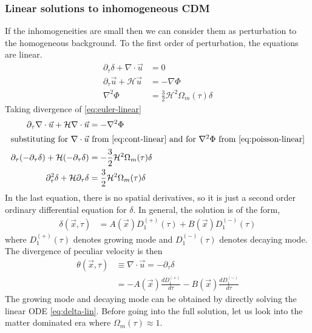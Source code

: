 \documentclass[12pt]{article}
\begin{document}
\subsubsection{Linear solutions to inhomogeneous CDM}
If the inhomogeneities are small then we can consider them as perturbation to the homogeneous background. To the first order of perturbation, the equations are linear.
\begin{align}
\label{eq:cont-linear}
\partial_{\tau} \delta + \nabla \cdot \vec{u} &= 0\\
\label{eq:euler-linear}
\partial_{\tau} \vec{u} + \mathcal{H} \vec{u} &= - \nabla \Phi\\
\label{eq:poisson-linear}
\nabla^2 \Phi &= \frac{3}{2} \mathcal{H}^2 \Omega_{m}(\tau) \delta
\end{align}
Taking divergence of \eqref{eq:euler-linear}
\begin{align}
\partial_{\tau} \nabla \cdot  \vec{u} + \mathcal{H} \nabla \cdot  \vec{u} &= - \nabla^2 \Phi \\
\intertext{substituting for $\nabla \cdot \vec{u}$ from \eqref{eq:cont-linear} and for $\nabla^2 \Phi$ from \eqref{eq:poisson-linear}}
\partial_{\tau} (-\partial_{\tau} \delta) + \mathcal{H} (-\partial_{\tau} \delta) &= - \frac{3}{2} \mathcal{H}^2 \Omega_{m}(\tau) \delta\\
\partial_{\tau}^2 \delta + \mathcal{H} \partial_{\tau} \delta &= \frac{3}{2} \mathcal{H}^2 \Omega_{m}(\tau) \delta \label{eq:delta-lin}
\end{align}
In the last equation, there is no spatial derivatives, so it is just a second order ordinary differential equation for $\delta$. In general, the solution is of the form,
\begin{align}
\delta (\vec{x}, \tau) &= A(\vec{x}) D_1^{(+)}(\tau) + B(\vec{x}) D_1^{(-)}(\tau) 
\end{align}
where $D_1^{(+)}(\tau)$ denotes growing mode and $D_1^{(-)}(\tau)$ denotes decaying mode. 
The divergence of peculiar velocity is then
\begin{align}
\theta  (\vec{x}, \tau) &\equiv \nabla \cdot  \vec{u} = -\partial_{\tau} \delta\\
&= - A(\vec{x}) \frac{d D_1^{(+)}}{d \tau} - B(\vec{x}) \frac{d D_1^{(-)}}{d \tau} 
\end{align}
The growing mode and decaying mode can be obtained by directly solving the linear ODE \eqref{eq:delta-lin}. Before going into the full solution, let us look into the matter dominated era where $\Omega_{m}(\tau) \approx 1$. 
\end{document}

